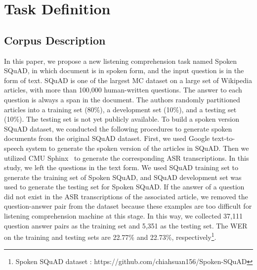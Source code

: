 \documentclass[a4paper]{article}
\begin{document}
\begin{comment}
\begin{figure}[t]
  \centering
  \texttt{[image: LaTeX/FIG/sqa\_2.png]}
  \caption{Flow diagram of the proposed spoken question answering. Spoken document, text question, ground-truth audio span of answer and manual transcription of answer are given. Predicted text span in transcriptions, ground-truth audio span of answer and manual transcription of answer are further evaluated in two approaches that will be illustrated in Figure~\ref{fig:evaluation}}
  \label{fig:sqa_task}
\end{figure}
\begin{figure}[t]
  \centering
  \texttt{[image: LaTeX/FIG/evaluation.png]}
  \caption{The illustration of two different kinds of evaluation approaches. The first approach compute exact match score and F1 score between manual transcription of answer and predicted text span in transcriptions. The second approach is to compute overlap score as described in \ref{eq1} }
  \label{fig:evaluation}
\end{figure}
\end{comment}

\section{Task Definition} 

\subsection{Corpus Description} 
In this paper, we   propose a new listening comprehension task   named Spoken SQuAD, in which document is in spoken form, and the input question is in the form of text. SQuAD is one of the largest MC dataset on a large set of Wikipedia articles, with more than 100,000 human-written questions. The answer to each question is always a span in the document. The authors randomly partitioned articles into a training set (80\%), a development set (10\%), and a testing set (10\%). The testing set is not yet publicly available. 
To build a spoken version SQuAD dataset, we conducted the following procedures to generate spoken documents from the original SQuAD dataset. 
First, we used Google text-to-speech system to generate the spoken version of the articles in SQuAD. 
Then we utilized CMU Sphinx~\cite{walker2004sphinx} to generate the corresponding ASR transcriptions. 
In this study, we left the questions in the  text form.
We used SQuAD training set to generate the training set of Spoken SQuAD, and SQuAD development set was used to generate the testing set for Spoken SQuAD. 
If the answer of a question did not exist in the ASR transcriptions of the associated article, we removed  the question-answer pair from the dataset because these examples are too difficult for listening comprehension machine at this stage. In this way, we collected 37,111 question answer pairs as the training set and 5,351 as the testing set. 
The WER on the training and testing sets are 22.77\% and 22.73\%, respectively\footnote{Spoken SQuAD dataset : https://github.com/chiahsuan156/Spoken-SQuAD}.
\end{document}
